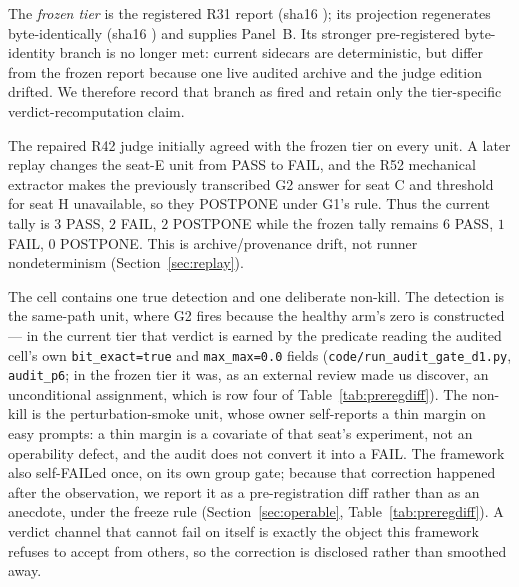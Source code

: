 \documentclass{article}
\begin{document}
The \emph{frozen tier} is the registered R31 report (sha16
); its projection regenerates byte-identically (sha16
) and supplies Panel~B. Its stronger pre-registered byte-identity
branch is no longer met: current sidecars are deterministic, but differ from the frozen
report because one live audited archive and the judge edition drifted. We therefore record
that branch as fired and retain only the tier-specific verdict-recomputation claim.

The repaired R42 judge initially agreed with the frozen tier on every unit. A later replay
changes the seat-E unit from PASS to FAIL, and the R52 mechanical extractor makes the
previously transcribed G2 answer for seat C and threshold for seat H unavailable, so they
POSTPONE under G1's rule. Thus the current tally is $3$ PASS, $2$ FAIL, $2$ POSTPONE while
the frozen tally remains $6$ PASS, $1$ FAIL, $0$ POSTPONE. This is archive/provenance drift,
not runner nondeterminism (Section~\ref{sec:replay}).

The cell contains one true detection and one deliberate non-kill. The detection is the
same-path unit, where G2 fires because the healthy arm's zero is constructed --- in the
current tier that verdict is earned by the predicate reading the audited cell's own
\texttt{bit\_exact=true} and \texttt{max\_max=0.0} fields (\texttt{code/run\_audit\_gate\_d1.py},
\texttt{audit\_p6}; in the frozen tier it was, as an external review made us discover, an
unconditional assignment, which is row four of Table~\ref{tab:preregdiff}). The non-kill
is the perturbation-smoke unit, whose owner self-reports a thin margin on easy prompts: a
thin margin is a covariate of that seat's experiment, not an operability defect, and the
audit does not convert it into a FAIL. The framework also self-FAILed once, on its own group
gate; because that correction happened after the observation, we report it as a
pre-registration diff rather than as an anecdote, under the freeze rule
(Section~\ref{sec:operable}, Table~\ref{tab:preregdiff}). A verdict channel that cannot fail
on itself is exactly the object this framework refuses to accept from others, so the
correction is disclosed rather than smoothed away.
\end{document}
